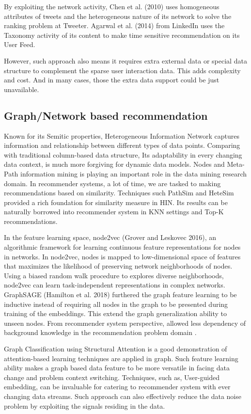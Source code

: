 By exploiting the network activity, Chen et al. (2010) uses homogeneous attributes of tweets and the heterogeneous nature of its network to solve the ranking problem at Tweeter. Agarwal et al. (2014) from LinkedIn uses the Taxonomy activity of its content to make time sensitive recommendation on its User Feed. 

However, such approach also means it requires extra external data or special data structure to complement the sparse user interaction data. This adds complexity and cost. And in many cases, those the extra data support could be just unavailable. 

\subsection{Graph/Network based recommendation}
Known for its Semitic properties, Heterogeneous Information Network captures information and relationship between different types of data points. Comparing with traditional column-based data structure, Its adaptability in every changing data context, is much more forgiving for dynamic data models. Nodes and Meta-Path information mining is playing an important role in the data mining research domain. In recommender systems, a lot of time, we are tasked to making recommendations based on similarity. Techniques such PathSim \citep{Sun2011PathSim} and HeteSim \citep{Shi2013HeteSim} provided a rich foundation for similarity measure in HIN. Its results can be naturally borrowed into recommender system in KNN settings and Top-K recommendations. 

In the feature learning space, node2vec (Grover and Leskovec 2016), an algorithmic framework for learning continuous feature representations for nodes in networks. In node2vec, nodes is mapped to low-dimensional space of features that maximizes the likelihood of preserving network neighborhoods of nodes. Using a biased random walk procedure to explores diverse neighborhoods, node2vec can learn task-independent representations in complex networks. GraphSAGE (Hamilton et al. 2018) furthered the graph feature learning to be inductive instead of requiring all nodes in the graph to be presented during training of the embeddings. This extend the graph generalization ability to unseen nodes. From recommender system perspective, allowed less dependency of background knowledge in the recommendation problem domain \citep{Hu2018}.  

Graph Classification using Structural Attention \citep{lee2018graph} is a good demonstration of attention-based learning techniques are applied in graph. Such feature learning ability makes a graph based data feature to be more versatile in facing data change and problem context switching. 
Techniques, such as, User-guided embedding, can be invaluable for catering to recommender system with ever changing data streams. Such approach can also effectively reduce the data noise problem by exploiting the signals residing in the data.  

